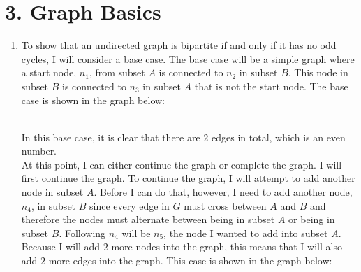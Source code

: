\documentclass[11pt]{article}
\begin{document}
\section*{3. Graph Basics}
\begin{enumerate}[label=(\alph*)]
\item
To show that an undirected graph is bipartite if and only if it has no odd cycles, I will consider a base case. The base case will be a simple graph where a start node, $n_1$, from subset $A$ is connected to $n_2$ in subset $B$. This node in subset $B$ is connected to $n_3$ in subset $A$ that is not the start node. The base case is shown in the graph below:
\\
\\
In this base case, it is clear that there are $2$ edges in total, which is an even number.
\vspace*{1\baselineskip}
\\
At this point, I can either continue the graph or complete the graph. I will first continue the graph. To continue the graph, I will attempt to add another node in subset $A$. Before I can do that, however, I need to add another node, $n_4$, in subset $B$ since every edge in $G$ must cross between $A$ and $B$ and therefore the nodes must alternate between being in subset $A$ or being in subset $B$. Following $n_4$ will be $n_5$, the node I wanted to add into subset $A$. Because I will add $2$ more nodes into the graph, this means that I will also add $2$ more edges into the graph. This case is shown in the graph below:
\\
\end{enumerate}
\end{document}
